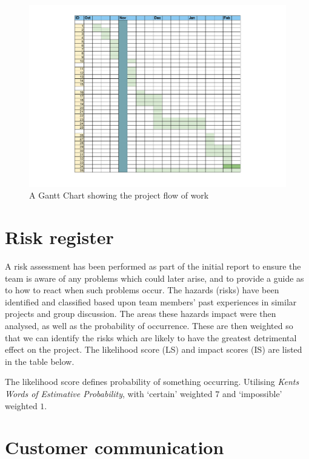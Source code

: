 \documentclass[10pt,a4paper]{article}
\begin{document}

\begin{figure}[H]
	\centering
	\includegraphics[width =21cm, trim=4cm 2cm 0cm 1.5cm]{pdf-images/gant}
	\caption{A Gantt Chart showing the project flow of work} 
	\label{fig:Gantt}
\end{figure}


\section{Risk register}

A risk assessment has been performed as part of the initial report to ensure the
team is aware of any problems which could later arise, and to provide a guide as
to how to react when such problems occur. The hazards (risks) have been
identified and classified based upon team members' past experiences in similar
projects and group discussion. The areas these hazards impact were then
analysed, as well as the probability of occurrence. These are then weighted so
that we can identify the risks which are likely to have the greatest detrimental
effect on the project. The likelihood score (LS) and impact scores (IS) are
listed in the table below.



The likelihood score defines probability of something occurring. Utilising
\textit{Kents Words of Estimative Probability}\cite{kent1966strategic}, with
`certain' weighted $7$ and `impossible' weighted $1$.




\section{Customer communication}
\end{document}
